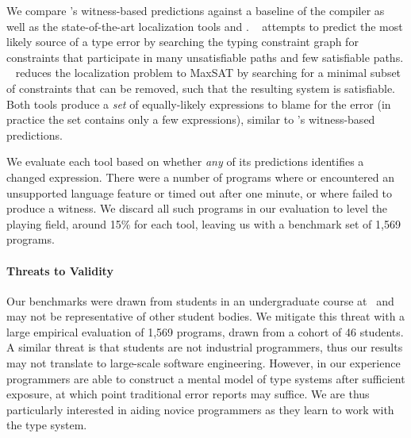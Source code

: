 We compare \toolname's witness-based predictions against a baseline of
the \ocaml compiler as well as the state-of-the-art %
localization tools \sherrloc and \mycroft.
%
\sherrloc~\cite{Zhang2014-lv} attempts to predict the most likely source
of a type error by searching the typing constraint graph for constraints
that participate in many unsatisfiable paths and few satisfiable paths.
%
\mycroft~\cite{Loncaric2016-uk} reduces the localization problem to
MaxSAT by searching for a minimal subset of constraints that can be
removed, such that the resulting system is satisfiable.
%
Both tools produce a \emph{set} of equally-likely expressions to blame
for the error (in practice the set contains only a few expressions),
similar to \toolname's witness-based predictions.

We evaluate each tool based on whether \emph{any} of its predictions
identifies a changed expression.
%
There were a number of programs where \mycroft or \sherrloc
encountered an unsupported language feature or timed out after one
minute, or where \toolname failed to produce a witness.
%
We discard all such programs in our evaluation to level the playing
field, around 15\% for each tool, leaving us with a benchmark set of
1,569 programs.

\paragraph{Threats to Validity}
Our benchmarks were drawn from students in an undergraduate course
at \ucsdbench\ and may not be representative of other student bodies.
%
We mitigate this threat with a large empirical evaluation of 1,569
programs, drawn from a cohort of 46 students.
%
A similar threat is that students are not industrial programmers, thus
our results may not translate to large-scale software engineering.
%
%
However, in our experience programmers are able to construct a mental
model of type systems after sufficient exposure, at which point
traditional error reports may suffice.
%
We are thus particularly interested in aiding novice programmers as
they learn to work with the type system.

